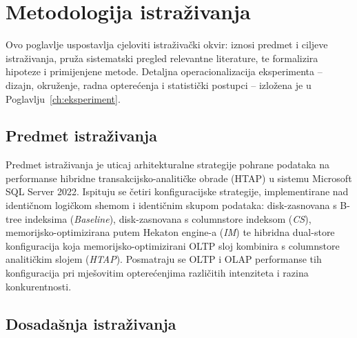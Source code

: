 \chapter{Metodologija istraživanja}
\label{ch:metodologija}

Ovo poglavlje uspostavlja cjeloviti istraživački okvir: iznosi predmet i ciljeve istraživanja, pruža sistematski pregled relevantne literature, te formalizira hipoteze i primijenjene metode. Detaljna operacionalizacija eksperimenta -- dizajn, okruženje, radna opterećenja i statistički postupci -- izložena je u Poglavlju~\ref{ch:eksperiment}.

\section{Predmet istraživanja}
\label{sec:predmet}

Predmet istraživanja je uticaj arhitekturalne strategije pohrane podataka na performanse hibridne transakcijsko-analitičke obrade (HTAP) u sistemu Microsoft SQL Server 2022. Ispituju se četiri konfiguracijske strategije, implementirane nad identičnom logičkom shemom i identičnim skupom podataka: disk-zasnovana s B-tree indeksima (\textit{Baseline}), disk-zasnovana s columnstore indeksom (\textit{CS}), memorijsko-optimizirana putem Hekaton engine-a (\textit{IM}) te hibridna dual-store konfiguracija koja memorijsko-optimizirani OLTP sloj kombinira s columnstore analitičkim slojem (\textit{HTAP}). Posmatraju se OLTP i OLAP performanse tih konfiguracija pri mješovitim opterećenjima različitih intenziteta i razina konkurentnosti.

\section{Dosadašnja istraživanja}
\label{ch:literatura}


